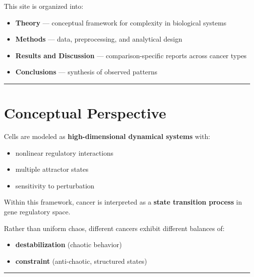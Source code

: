 \documentclass[
  letterpaper,
  DIV=11,
  numbers=noendperiod,
  openany,
  oneside]{scrreprt}
\providecommand{\tightlist}{%
  \setlength{\itemsep}{0pt}\setlength{\parskip}{0pt}}
\begin{document}
This site is organized into:

\begin{itemize}
\tightlist
\item
  \textbf{Theory} --- conceptual framework for complexity in biological
  systems\\
\item
  \textbf{Methods} --- data, preprocessing, and analytical design\\
\item
  \textbf{Results and Discussion} --- comparison-specific reports across
  cancer types\\
\item
  \textbf{Conclusions} --- synthesis of observed patterns
\end{itemize}

\begin{center}\rule{0.5\linewidth}{0.5pt}\end{center}

\section{Conceptual Perspective}\label{conceptual-perspective}

Cells are modeled as \textbf{high-dimensional dynamical systems} with:

\begin{itemize}
\tightlist
\item
  nonlinear regulatory interactions\\
\item
  multiple attractor states\\
\item
  sensitivity to perturbation
\end{itemize}

Within this framework, cancer is interpreted as a \textbf{state
transition process} in gene regulatory space.

Rather than uniform chaos, different cancers exhibit different balances
of:

\begin{itemize}
\tightlist
\item
  \textbf{destabilization} (chaotic behavior)\\
\item
  \textbf{constraint} (anti-chaotic, structured states)
\end{itemize}

\begin{center}\rule{0.5\linewidth}{0.5pt}\end{center}
\end{document}
